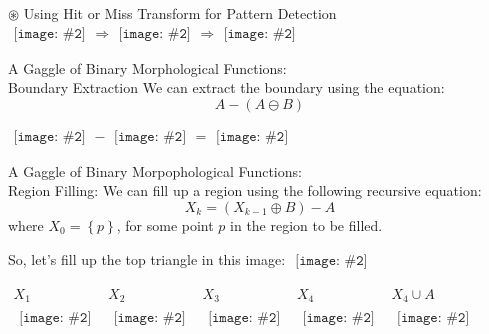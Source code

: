 \documentclass{beamer}
\newcommand{\pic}[2]{
     \begin{array}{l}
      \texttt{[image: \#2]}
      \end{array}
}
\newcommand{\set}[1]{\left\lbrace #1 \right\rbrace}
\newcommand{\union}{\cup}
\newcommand{\dilate}{\oplus}
\newcommand{\erode}{\ominus}
\newcommand{\hitmiss}{\circledast}
\begin{document}
\begin{frame}{$\hitmiss$ Using Hit or Miss Transform for Pattern Detection}
  $\pic{width=75pt}{images/tux_coolhamblenhitmiss.png} 
   \Rightarrow \pic{width=75pt}{images/tux_coolhamblenhitmisstransformed.png}
   \Rightarrow \pic{width=75pt}{images/tux_coolhamblenhitmisstransformeddilate.png}
$


\end{frame}
\begin{frame}{A Gaggle of  Binary Morphological Functions:\\
              Boundary Extraction}
We can extract the boundary using the equation:
$$A - (A \erode B)$$

$\pic{width=75pt}{images/binarycoolhamblen.png}
 -
 \pic{width=75pt}{images/coolhamblen_eroded.png}
 =
 \pic{width=75pt}{images/coolhamblen_boundary.png}$

\end{frame}
\begin{frame}{A Gaggle of Binary Morpophological Functions:\\
              Region Filling:}
  We can fill up a region using the following recursive equation:
  $$X_k=(X_{k-1}\dilate B)-A$$
  where $X_0 = \set{p}$, for some point $p$ in the region to be filled.

  So, let's fill up the top triangle in this image: 
  $\pic{width=20pt}{images/triangles.png}$

$
    \begin{array}{c|c|c|c|c|c}
     X_1 & X_2 & X_3 & X_4 & X_4 \union A\\\hline
     \pic{width=20pt}{images/triangles1.png}
     &\pic{width=20pt}{images/triangles2.png}
     &\pic{width=20pt}{images/triangles3.png}
     &\pic{width=20pt}{images/triangles4.png}
     &\pic{width=20pt}{images/trianglesfilled.png}
   \end{array}$
 

\end{frame}
\end{document}
